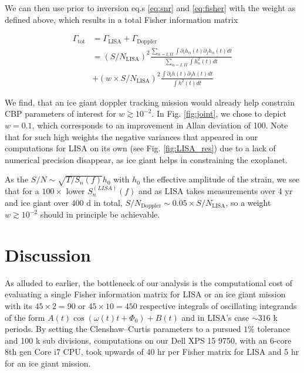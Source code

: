 \documentclass{aa}
\begin{document}
We can then use prior to inversion eq.s \ref{eq:snr} and \ref{eq:fisher} with the weight as defined above, which results in a total Fisher information matrix

\begin{equation}
\begin{split}
    \Gamma_\mathrm{tot} &= \Gamma_\mathrm{LISA} + \Gamma_\mathrm{Doppler} \\ &= \left( S/N_\mathrm{LISA} \right)^2 \frac{ \sum_{\alpha=I,II} \int \partial_i h_\alpha(t) \partial_j h_\alpha(t) dt}{ \sum_{\alpha=I,II} \int h_\alpha^2(t) dt} \\ &+ \left( w\times S/N_\mathrm{LISA} \right)^2 \frac{\int \partial_i h(t) \partial_j h(t) dt}{\int h^2(t) dt}
\end{split}
\end{equation}

We find, that an ice giant doppler tracking mission would already help constrain CBP parameters of interest for $w\gtrsim 10^{-2}$. In Fig. \ref{fig:joint}, we chose to depict $w=0.1$, which corresponds to an improvement in Allan deviation of 100. Note that for such high weights the negative variances that appeared in our computations for LISA on its own (see Fig. \ref{fig:LISA_res}) due to a lack of numerical precision disappear, as ice giant helps in constraining the exoplanet.

As the $S/N\sim\sqrt{T/S_n(f)}h_0$ with $h_0$ the effective amplitude of the strain, we see that for a $100\times$ lower $S_n^{(LISA)}(f)$ and as LISA takes measurements over 4 yr and ice giant over 400 d in total, $S/N_\mathrm{Doppler}\sim 0.05 \times S/N_\mathrm{LISA}$, so a weight $w\gtrsim 10^{-2}$ should in principle be achievable.

\section{Discussion}
\label{sec:disc}

As alluded to earlier, the bottleneck of our analysis is the computational cost of evaluating a single Fisher information matrix for LISA or an ice giant mission with its $45\times 2=90$ or $45\times 10=450$ respective integrals of oscillating integrands of the form $A(t)\cos(\omega(t)t+\Phi_0) + B(t)$ and in LISA's case $\sim 316$ k periods. By setting the Clenshaw–Curtis parameters to a pursued $1\%$ tolerance and 100 k sub divisions, computations on our Dell XPS 15 9750, with an 6-core 8th gen Core i7 CPU, took upwards of 40 hr per Fisher matrix for LISA and 5 hr for an ice giant mission.
\end{document}
